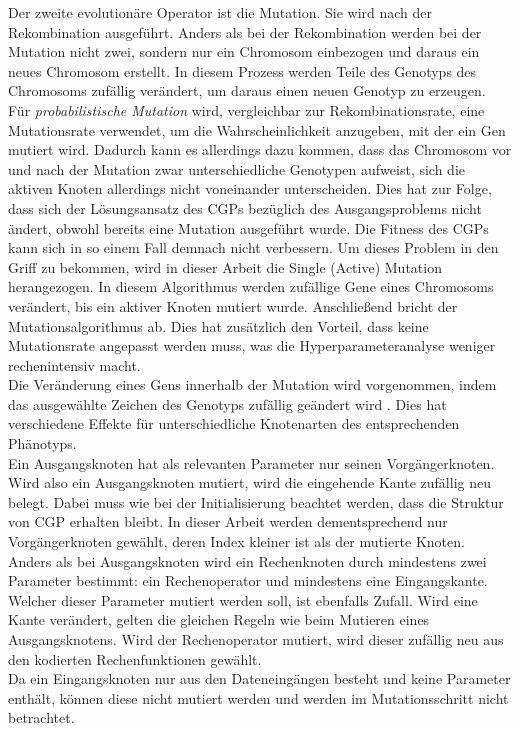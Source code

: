 Der zweite evolutionäre Operator ist die Mutation.
Sie wird nach der Rekombination ausgeführt.
Anders als bei der Rekombination werden bei der Mutation nicht zwei, sondern nur ein Chromosom einbezogen und daraus ein neues Chromosom erstellt.
In diesem Prozess werden Teile des Genotyps des Chromosoms zufällig verändert, um daraus einen neuen Genotyp zu erzeugen. \cite{milad_taleby_ahvanooey_survey_2019}\\
Für \emph{probabilistische Mutation} wird, vergleichbar zur Rekombinationsrate, eine Mutationsrate verwendet, um die Wahrscheinlichkeit anzugeben, mit der ein Gen mutiert wird.
Dadurch kann es allerdings dazu kommen, dass das Chromosom vor und nach der Mutation zwar unterschiedliche Genotypen aufweist, sich die aktiven Knoten allerdings nicht voneinander unterscheiden.
Dies hat zur Folge, dass sich der Lösungsansatz des CGPs bezüglich des Ausgangsproblems nicht ändert, obwohl bereits eine Mutation ausgeführt wurde.
Die Fitness des CGPs kann sich in so einem Fall demnach nicht verbessern.
Um dieses Problem in den Griff zu bekommen, wird in dieser Arbeit die Single (Active) Mutation herangezogen.
In diesem Algorithmus werden zufällige Gene eines Chromosoms verändert, bis ein aktiver Knoten mutiert wurde.
Anschließend bricht der Mutationsalgorithmus ab. \cite{miller_cartesian_2020}
Dies hat zusätzlich den Vorteil, dass keine Mutationsrate angepasst werden muss, was die Hyperparameteranalyse weniger rechenintensiv macht.\\

Die Veränderung eines Gens innerhalb der Mutation wird vorgenommen, indem das ausgewählte Zeichen des Genotyps zufällig geändert wird \cite{koza_survey_1995}. Dies hat verschiedene Effekte für unterschiedliche Knotenarten des entsprechenden Phänotyps.\\
Ein Ausgangsknoten hat als relevanten Parameter nur seinen Vorgängerknoten.
Wird also ein Ausgangsknoten mutiert, wird die eingehende Kante zufällig neu belegt.
Dabei muss wie bei der Initialisierung beachtet werden, dass die Struktur von CGP erhalten bleibt.
In dieser Arbeit werden dementsprechend nur Vorgängerknoten gewählt, deren Index kleiner ist als der mutierte Knoten.\\
Anders als bei Ausgangsknoten wird ein Rechenknoten durch mindestens zwei Parameter bestimmt: ein Rechenoperator und mindestens eine Eingangskante.
Welcher dieser Parameter mutiert werden soll, ist ebenfalls Zufall.
Wird eine Kante verändert, gelten die gleichen Regeln wie beim Mutieren eines Ausgangsknotens.
Wird der Rechenoperator mutiert, wird dieser zufällig neu aus den kodierten Rechenfunktionen gewählt.\\
Da ein Eingangsknoten nur aus den Dateneingängen besteht und keine Parameter enthält, können diese nicht mutiert werden und werden im Mutationsschritt nicht betrachtet.

